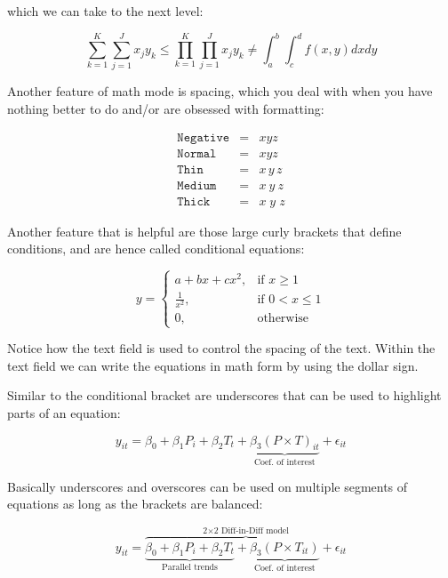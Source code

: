 \documentclass[11pt]{article}
\numberwithin{table}{section}   %
\begin{document}
which we can take to the next level:

\begin{equation}
    \sum^K_{k=1}\sum^J_{j=1} x_j y_k \leq \prod^K_{k=1}\prod^J_{j=1} x_j y_k \neq \int_{a}^{b}\int_{c}^{d} f(x,y) dxdy
\end{equation}

Another feature of math mode is spacing, which you deal with when you have nothing better to do and/or are obsessed with formatting:

\begin{eqnarray}
    \texttt{Negative} &=& x\!y\!z   \\ \nonumber
    \texttt{Normal} &=& xyz         \\ \nonumber
    \texttt{Thin} &=& x\,y\,z       \\ \nonumber
    \texttt{Medium} &=& x\:y\:z     \\ \nonumber
    \texttt{Thick} &=& x\;y\;z 
\end{eqnarray}


Another feature that is helpful are those large curly brackets that define conditions, and are hence called conditional equations:

\begin{equation}
y=
\begin{cases}
			a + bx + cx^2, & \text{if $x \geq 1$} \\
			\frac{1}{x^2}, & \text{if $0 < x \leq 1$} \\
            0, & \text{otherwise} 
		 \end{cases}
\end{equation}

Notice how the text field is used to control the spacing of the text. Within the text field we can write the equations in math form by using the dollar sign.

Similar to the conditional bracket are underscores that can be used to highlight parts of an equation:

\begin{equation}
    y_{it} = \beta_0 + \beta_1 P_i + \beta_2 T_t + \underbrace{\beta_3 \left({P \times T}\right)_{it}}_{\text{Coef. of interest}} + \epsilon_{it}
\end{equation}

Basically underscores and overscores can be used on multiple segments of equations as long as the brackets are balanced:

\begin{equation}
    y_{it} = \overbrace{\underbrace{\beta_0 + \beta_1 P_i + \beta_2 T_t}_{\text{Parallel trends}} + \underbrace{\beta_3 \left({P \times T}_{it}\right)}_{\text{Coef. of interest}} + \epsilon_{it}}^{\text{2$\times$2 Diff-in-Diff model}}
\end{equation}
\end{document}
